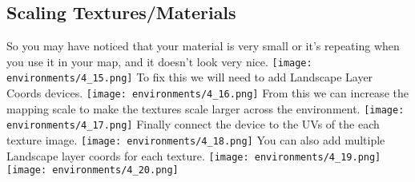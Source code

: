 \documentclass[../main.tex]{subfiles}
\begin{document}
\subsection{Scaling Textures/Materials}
So you may have noticed that your material is very small or it’s repeating when you use it in your map, and it doesn’t look very nice.
\texttt{[image: environments/4\_15.png]}
To fix this we will need to add Landscape Layer Coords devices.
\texttt{[image: environments/4\_16.png]}
From this we can increase the mapping scale to make the textures scale larger across the environment.
\texttt{[image: environments/4\_17.png]}
Finally connect the device to the UVs of the each texture image.
\texttt{[image: environments/4\_18.png]}
You can also add multiple Landscape layer coords for each texture.
\texttt{[image: environments/4\_19.png]}
\texttt{[image: environments/4\_20.png]}
\end{document}
